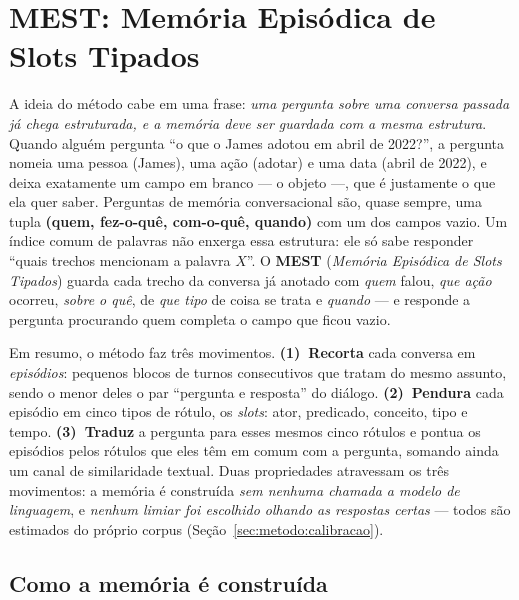 
\section{MEST: Memória Episódica de Slots Tipados}
\label{sec:metodo}

A ideia do método cabe em uma frase: \emph{uma pergunta sobre uma conversa passada
já chega estruturada, e a memória deve ser guardada com a mesma estrutura}. Quando
alguém pergunta ``o que o James adotou em abril de 2022?'', a pergunta nomeia uma
pessoa (James), uma ação (adotar) e uma data (abril de 2022), e deixa exatamente um
campo em branco --- o objeto ---, que é justamente o que ela quer saber. Perguntas
de memória conversacional são, quase sempre, uma tupla \textbf{(quem, fez-o-quê,
com-o-quê, quando)} com um dos campos vazio. Um índice comum de palavras não
enxerga essa estrutura: ele só sabe responder ``quais trechos mencionam a palavra
$X$''. O \textbf{MEST} (\emph{Memória Episódica de Slots Tipados}) guarda cada
trecho da conversa já anotado com \emph{quem} falou, \emph{que ação} ocorreu,
\emph{sobre o quê}, de \emph{que tipo} de coisa se trata e \emph{quando} --- e
responde a pergunta procurando quem completa o campo que ficou vazio.

Em resumo, o método faz três movimentos. \textbf{(1)~Recorta} cada conversa em
\emph{episódios}: pequenos blocos de turnos consecutivos que tratam do mesmo
assunto, sendo o menor deles o par ``pergunta e resposta'' do diálogo.
\textbf{(2)~Pendura} cada episódio em cinco tipos de rótulo, os
\emph{slots}: ator, predicado, conceito, tipo e tempo. \textbf{(3)~Traduz} a pergunta para
esses mesmos cinco rótulos e pontua os episódios pelos rótulos que eles têm em
comum com a pergunta, somando ainda um canal de similaridade textual. Duas
propriedades atravessam os três movimentos: a memória é construída \emph{sem
nenhuma chamada a modelo de linguagem}, e \emph{nenhum limiar foi escolhido
olhando as respostas certas} --- todos são estimados do próprio corpus
(Seção~\ref{sec:metodo:calibracao}).

\subsection{Como a memória é construída}
\label{sec:metodo:substrato}

